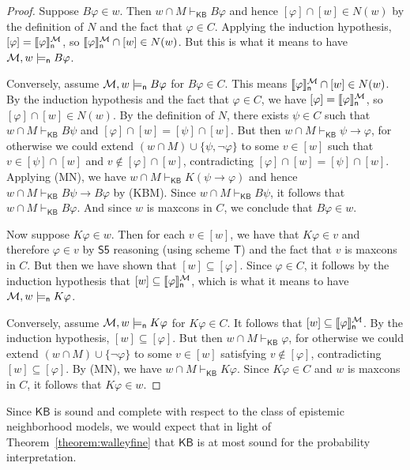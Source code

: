 \documentclass[12pt]{article}
\theoremstyle{definition}
\newcommand{\M}{{\cal M}}      %
\newcommand{\KB}{{\mathsf{KB}}}                 %
\newcommand{\modelsn}{\models_{\mathsf{n}}}                  %
\newcommand{\semn}[1]{\llbracket{#1}\rrbracket_{\mathsf{n}}} %
\begin{document}
\begin{proof}
  Suppose $B\varphi\in w$. Then $w\cap M\vdash_\KB B\varphi$ and hence
  $[\varphi]\cap[w]\in N(w)$ by the definition of $N$ and the fact
  that $\varphi\in C$. Applying the induction hypothesis,
  $[\varphi]=\semn{\varphi}^\M$, so
  $\semn{\varphi}^\M\cap[w]\in N(w)$.  But this is what it means to
  have $\M,w\modelsn B\varphi$.

  Conversely, assume $\M,w\modelsn B\varphi$ for $B\varphi\in C$. This
  means $\semn{\varphi}^\M\cap[w]\in N(w)$.  By the induction
  hypothesis and the fact that $\varphi\in C$, we have
  $[\varphi]=\semn{\varphi}^\M$, so $[\varphi]\cap[w]\in N(w)$.  By
  the definition of $N$, there exists $\psi\in C$ such that
  $w\cap M\vdash_\KB B\psi$ and $[\varphi]\cap[w]=[\psi]\cap[w]$.  But
  then $w\cap M\vdash_\KB\psi\to\varphi$, for otherwise we could
  extend $(w\cap M)\cup\{\psi,\lnot\varphi\}$ to some $v\in[w]$ such
  that $v\in[\psi]\cap[w]$ and $v\notin[\varphi]\cap[w]$,
  contradicting $[\varphi]\cap[w]=[\psi]\cap[w]$.  Applying (MN), we
  have $w\cap M\vdash_\KB K(\psi\to\varphi)$ and hence
  $w\cap M\vdash_\KB B\psi\to B\varphi$ by (KBM).  Since
  $w\cap M\vdash_\KB B\psi$, it follows that
  $w\cap M\vdash_\KB B\varphi$.  And since $w$ is maxcons in $C$, we
  conclude that $B\varphi\in w$.

  Now suppose $K\varphi\in w$.  Then for each $v\in [w]$, we have
  that $K\varphi\in v$ and therefore $\varphi\in v$ by $\mathsf{S5}$
  reasoning (using scheme $\mathsf{T}$) and the fact that $v$ is
  maxcons in $C$.  But then we have shown that
  $[w]\subseteq[\varphi]$.  Since $\varphi\in C$, it follows by the
  induction hypothesis that $[w]\subseteq\semn{\varphi}^\M$, which
  is what it means to have $\M,w\modelsn K\varphi$.

  Conversely, assume $\M,w\modelsn K\varphi$ for $K\varphi\in C$. It
  follows that $[w]\subseteq\semn{\varphi}^\M$.  By the induction
  hypothesis, $[w]\subseteq[\varphi]$.  But then
  $w\cap M\vdash_\KB\varphi$, for otherwise we could extend
  $(w\cap M)\cup\{\lnot\varphi\}$ to some $v\in[w]$ satisfying
  $v\notin[\varphi]$, contradicting $[w]\subseteq[\varphi]$.  By (MN),
  we have $w\cap M\vdash_\KB K\varphi$.  Since $K\varphi\in C$ and $w$
  is maxcons in $C$, it follows that $K\varphi\in w$.
\end{proof}

Since $\KB$ is sound and complete with respect to the class of
epistemic neighborhood models, we would expect that in light of
Theorem~\ref{theorem:walleyfine} that $\KB$ is at most sound for the
probability interpretation.
\end{document}
